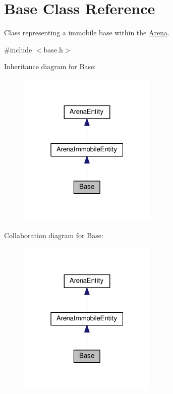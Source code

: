 \hypertarget{classBase}{}\section{Base Class Reference}
\label{classBase}


Class representing a immobile base within the \hyperlink{classArena}{Arena}.  




{\ttfamily \#include $<$base.\+h$>$}



Inheritance diagram for Base\+:
\nopagebreak
\begin{figure}[H]
\begin{center}
\leavevmode
\includegraphics[width=187pt]{classBase__inherit__graph}
\end{center}
\end{figure}


Collaboration diagram for Base\+:
\nopagebreak
\begin{figure}[H]
\begin{center}
\leavevmode
\includegraphics[width=187pt]{classBase__coll__graph}
\end{center}
\end{figure}
